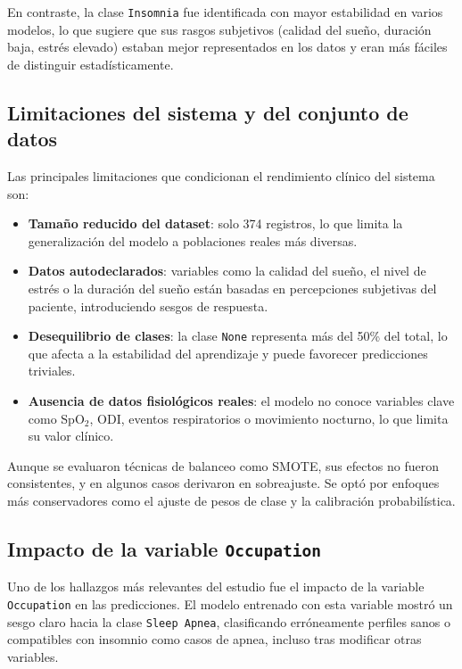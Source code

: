 En contraste, la clase \texttt{Insomnia} fue identificada con mayor estabilidad en varios modelos, lo que sugiere que sus rasgos subjetivos (calidad del sueño, duración baja, estrés elevado) estaban mejor representados en los datos y eran más fáciles de distinguir estadísticamente.



\subsection{Limitaciones del sistema y del conjunto de datos}

Las principales limitaciones que condicionan el rendimiento clínico del sistema son:

\begin{itemize}
    \item \textbf{Tamaño reducido del dataset}: solo 374 registros, lo que limita la generalización del modelo a poblaciones reales más diversas.
    \item \textbf{Datos autodeclarados}: variables como la calidad del sueño, el nivel de estrés o la duración del sueño están basadas en percepciones subjetivas del paciente, introduciendo sesgos de respuesta.
    \item \textbf{Desequilibrio de clases}: la clase \texttt{None} representa más del 50\% del total, lo que afecta a la estabilidad del aprendizaje y puede favorecer predicciones triviales.
    \item \textbf{Ausencia de datos fisiológicos reales}: el modelo no conoce variables clave como SpO$_2$, ODI, eventos respiratorios o movimiento nocturno, lo que limita su valor clínico.
\end{itemize}

Aunque se evaluaron técnicas de balanceo como SMOTE, sus efectos no fueron consistentes, y en algunos casos derivaron en sobreajuste. Se optó por enfoques más conservadores como el ajuste de pesos de clase y la calibración probabilística.

\subsection{Impacto de la variable \texttt{Occupation}}

Uno de los hallazgos más relevantes del estudio fue el impacto de la variable \texttt{Occupation} en las predicciones. El modelo entrenado con esta variable mostró un sesgo claro hacia la clase \texttt{Sleep Apnea}, clasificando erróneamente perfiles sanos o compatibles con insomnio como casos de apnea, incluso tras modificar otras variables.

